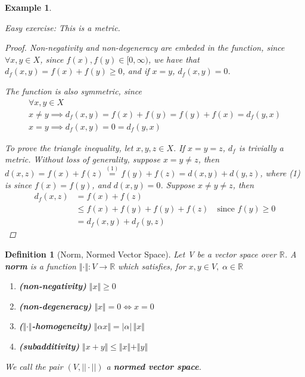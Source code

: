 \documentclass[11pt, oneside]{book}
\theoremstyle{break}
\newtheorem*{proof}{Proof}
\newtheorem{defn}{Definition}[section]
\newtheorem{eg}{Example}[section]
\newcommand{\bb}[1]{\mathbb{#1}}			%
\begin{document}
\begin{eg}
\begin{enumerate}
			Easy exercise: This is a metric.
			\begin{proof}
				Non-negativity and non-degeneracy are embeded in the function, since $\forall x, y \in X$, since $f(x), f(y) \in [0, \infty)$, we have that $d_f(x, y) = f(x) + f(y) \geq 0$, and if $x = y$, $d_f(x,y) = 0$.

				The function is also symmetric, since
				\begin{gather*}
					\forall x, y \in X \\
					x \neq y \implies d_f(x, y) = f(x) + f(y) = f(y) + f(x) = d_f(y, x) \\
					x = y \implies d_f(x,y) = 0 = d_f(y, x)
				\end{gather*}

				To prove the triangle inequality, let $x, y, z \in X$. If $x = y = z$, $d_f$ is trivially a metric. Without loss of generality, suppose $x = y \neq z$, then $d(x, z) = f(x) + f(z) \overset{(1)}{=} f(y) + f(z) = d(x,y) + d(y, z)$, where (1) is since $f(x) = f(y)$, and $d(x,y) = 0$. Suppose $x \neq y \neq z$, then
				\begin{align*}
					d_f(x, z) &= f(x) + f(z) \\
						&\leq f(x) + f(y) + f(y) + f(z) \quad \text{since $f(y) \geq 0$} \\
						&= d_f(x, y) + d_f(y, z)
				\end{align*}
			\end{proof}
	\end{enumerate}
\end{eg}

\begin{defn}[Norm, Normed Vector Space]
	Let V be a vector space over $\bb{R}$. A \textbf{norm} is a function $\Vert \cdot \Vert : V \to \bb{R}$ which satisfies, for $x, y \in V, \; \alpha \in \bb{R}$
	\begin{enumerate}
		\item \textbf{(non-negativity)} $\Vert x \Vert  \geq 0$
		\item \textbf{(non-degeneracy)} $\Vert x \Vert  = 0 \iff x = 0$
		\item \textbf{($\Vert \cdot\Vert $-homogeneity)} $\Vert \alpha x \Vert  = |\alpha| \, \Vert x \Vert $
		\item \textbf{(subadditivity)} $\Vert x + y \Vert  \leq \Vert x \Vert  + \Vert y \Vert $
	\end{enumerate}
	We call the pair $(V, ||\cdot||)$ a \textbf{normed vector space}.
\end{defn}
\end{document}
